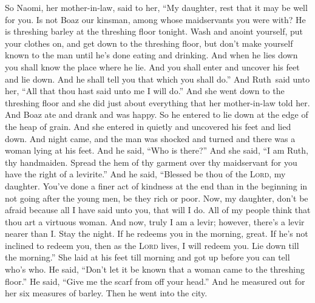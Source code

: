 
\begin{inparaenum}
   So Naomi, her mother-in-law, said to her, ``My daughter, rest that it may be well for you.%
   Is not Boaz our kinsman, among whose maidservants you were with? He is threshing barley at the threshing floor tonight.%
   Wash and anoint yourself, put your clothes on, and get down to the threshing floor, but don't make yourself known to the man until he's done eating and drinking.%
   And when he lies down you shall know the place where he lie. And you shall enter and uncover his feet and lie down. And he shall tell you that which you shall do.''%
   And Ruth\understood\ said unto her, ``All that thou hast said unto me I will do.''%
   And she went down to the threshing floor and she did just about everything that her mother-in-law told her.%
   And Boaz ate and drank and was happy. So he entered to lie down at the edge of the heap of grain. And she entered in quietly and uncovered his feet and lied down.%
   And night came, and the man was shocked and turned and there was a woman lying at his feet.%
   And he said, ``Who is there?'' And she said, ``I am Ruth, thy handmaiden. Spread the hem of thy garment over thy maidservant for you have the right of a levirite.''%
   And he said, ``Blessed be thou of the \textsc{Lord}, my daughter. You've done a finer act of kindness at the end than in the beginning in not going after the young men, be they rich or poor.%
   Now, my daughter, don't be afraid because all I have said unto you, that will I do. All of my people think that thou art a virtuous woman.%
   And now, truly I am a levir; however, there's a levir nearer than I.%
   Stay the night. If he redeems you in the morning, great. If he's not inclined to redeem you, then as the \textsc{Lord} lives, I will redeem you. Lie down till the morning.''%
   She laid at his feet till morning and got up before you can tell who's who. He said, ``Don't let it be known that a woman came to the threshing floor.''%
   He said, ``Give me the scarf from off your head.'' And he measured out for her six measures of barley. Then he went into the city.%

\end{inparaenum}
